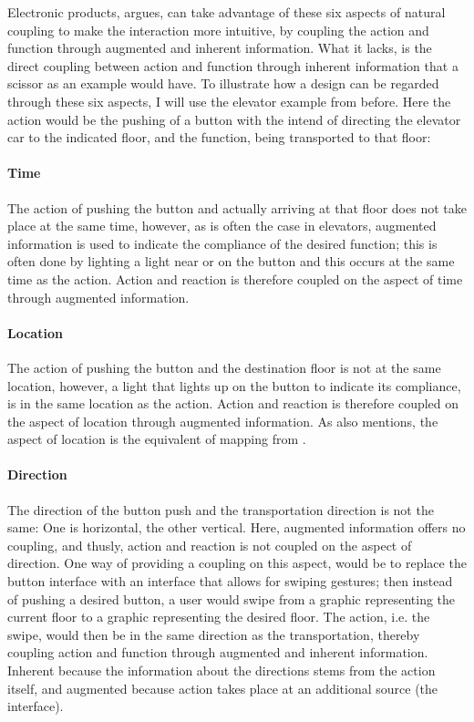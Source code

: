 Electronic products,  argues, can take advantage of these six aspects of natural coupling to make the interaction more intuitive, by coupling the action and function through augmented and inherent information. What it lacks, is the direct coupling between action and function through inherent information that a scissor as an example would have. To illustrate how a design can be regarded through these six aspects, I will use the elevator example from before. Here the action would be the pushing of a button with the intend of directing the elevator car to the indicated floor, and the function, being transported to that floor:
\paragraph{Time} The action of pushing the button and actually arriving at that floor does not take place at the same time, however, as is often the case in elevators, augmented information is used to indicate the compliance of the desired function; this is often done by lighting a light near or on the button and this occurs at the same time as the action. Action and reaction is therefore coupled on the aspect of time through augmented information.
\paragraph{Location} The action of pushing the button and the destination floor is not at the same location, however, a light that lights up on the button to indicate its compliance, is in the same location as the action. Action and reaction is therefore coupled on the aspect of location through augmented information. As  also mentions, the aspect of location is the equivalent of mapping from .
\paragraph{Direction} The direction of the button push and the transportation direction is not the same: One is horizontal, the other vertical. Here, augmented information offers no coupling, and thusly, action and reaction is not coupled on the aspect of direction. One way of providing a coupling on this aspect, would be to replace the button interface with an interface that allows for swiping gestures; then instead of pushing a desired button, a user would swipe from a graphic representing the current floor to a graphic representing the desired floor. The action, i.e. the swipe, would then be in the same direction as the transportation, thereby coupling action and function through augmented and inherent information. Inherent because the information about the directions stems from the action itself, and augmented because action takes place at an additional source (the interface).
